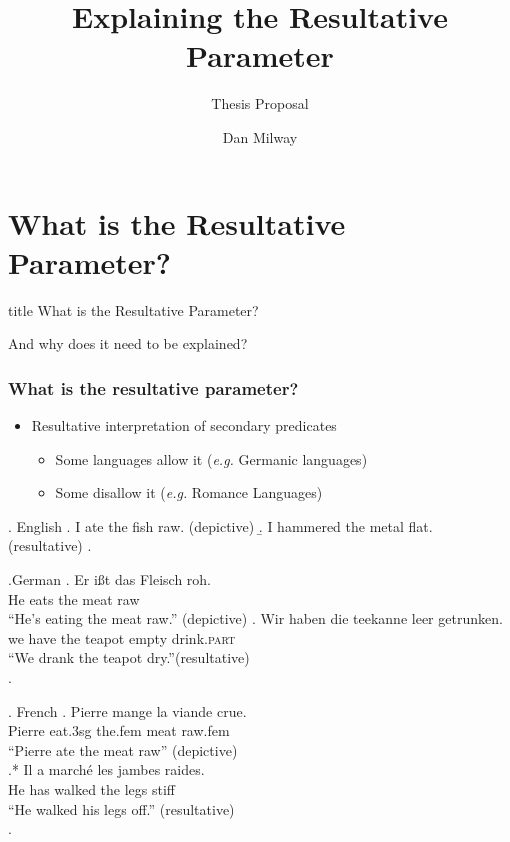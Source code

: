 \documentclass{beamer}
\title{Explaining the Resultative Parameter}
\subtitle{Thesis Proposal}
\author{Dan Milway}
\begin{document}
\section{}
\frame[plain]{\titlepage}
\section{What is the Resultative Parameter?}
\begin{frame}
  \vfill
  \centering
  \begin{beamercolorbox}[sep=8pt,center]{title}
    What is the Resultative Parameter?
  \end{beamercolorbox}
  And why does it need to be explained?
  \vfill
\end{frame}
\begin{frame}
  \frametitle{What is the resultative parameter?}
  \begin{itemize}
    \item Resultative interpretation of secondary predicates
      \begin{itemize}
	\item<1-> Some languages allow it (\textit{e.g.} Germanic languages)
	\item<4-> Some disallow it (\textit{e.g.} Romance Languages)
      \end{itemize}
  \end{itemize}
  \begin{overprint}
    \ex. English
    \a. I ate the fish raw. (depictive)
    \b. I hammered the metal flat. (resultative)
    \z.

    \ex.German 
    \ag. Er i\ss{}t das Fleisch roh. \parencite{muller2004analysis}\\
    He eats the meat raw\\
    ``He's eating the meat raw.'' (depictive)
    \bg. Wir haben die teekanne leer getrunken.\\
    we have the teapot empty drink.\textsc{part}\\
    ``We drank the teapot dry.''(resultative)\\
    \parencite{kratzer_building_2004}
    \z.

    \ex. French
    \ag. Pierre mange la viande crue.\\
    Pierre eat.3sg the.fem meat raw.fem\\
    ``Pierre ate the meat raw'' (depictive)\\
    \parencite{legendre1997secondary}
    \bg.* Il a march\'e les jambes raides.\\
    He has walked the legs stiff\\
    ``He walked his legs off.'' (resultative)\\
    \parencite{washio1997resultatives}
    \z.


\end{overprint}
\end{frame}
\end{document}
